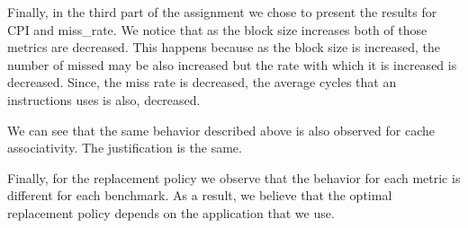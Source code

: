 \documentclass[a4paper,12pt]{article}
\begin{document}
\par Finally, in the third part of the assignment we chose to present the results for CPI and miss\_rate. We notice that as the block size increases both of those metrics are decreased. This happens because as the block size is increased, the number of missed may be also increased but the rate with which it is increased is decreased. Since, the miss rate is decreased, the average cycles that an instructions uses is also, decreased. 
\par We can see that the same behavior described above is also observed for cache associativity. The justification is the same. 
\par Finally, for the replacement policy we observe that the behavior for each metric is different for each benchmark. As a result, we believe that the optimal replacement policy depends on the application that we use.  
\end{document}
